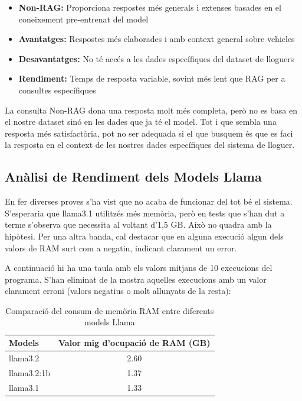 \documentclass[12pt,a4paper]{article}
\begin{document}
\begin{itemize}
    \item \textbf{Non-RAG:} Proporciona respostes més generals i extenses basades en el coneixement pre-entrenat del model
    \item \textbf{Avantatges:} Respostes més elaborades i amb context general sobre vehicles
    \item \textbf{Desavantatges:} No té accés a les dades específiques del dataset de lloguers
    \item \textbf{Rendiment:} Temps de resposta variable, sovint més lent que RAG per a consultes específiques
\end{itemize}

La consulta Non-RAG dona una resposta molt més completa, però no es basa en el nostre dataset sinó en les dades que ja té el model. Tot i que sembla una resposta més satisfactòria, pot no ser adequada si el que busquem és que es faci la resposta en el context de les nostres dades específiques del sistema de lloguer.

\subsection{Anàlisi de Rendiment dels Models Llama}

En fer diverses proves s'ha vist que no acaba de funcionar del tot bé el sistema. 
S'esperaria que llama3.1 utilitzés més memòria, però en tests que s'han dut a terme s'observa que necessita al voltant d'1,5 GB. 
Això no quadra amb la hipòtesi. Per una altra banda, cal destacar que en alguna execució algun dels valors de RAM surt com a negatiu, indicant clarament un error.

A continuació hi ha una taula amb els valors mitjans de 10 execucions del programa. S'han eliminat de la mostra aquelles 
execucions amb un valor clarament erroni (valors negatius o molt allunyats de la resta):

\begin{table}[H]
\centering
\begin{tabular}{@{}lc@{}}
\toprule
\textbf{Models} & \textbf{Valor mig d'ocupació de RAM (GB)} \\
\midrule
llama3.2 & 2.60 \\
llama3.2:1b & 1.37 \\
llama3.1 & 1.33 \\
\bottomrule
\end{tabular}
\caption{Comparació del consum de memòria RAM entre diferents models Llama}
\end{table}
\end{document}
